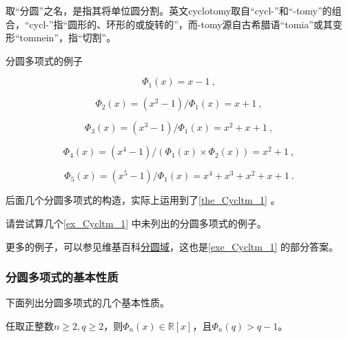 取“分圆”之名，是指其将单位圆分割。英文cyclotomy取自“cycl-”和“-tomy”的组合，“cycl-”指“圆形的、环形的或旋转的”，而-tomy源自古希腊语“tomia”或其变形“tomnein”，指“切割”。




\begin{example}{分圆多项式的例子}\label{ex_Cycltm_1}

\begin{equation}
\Phi_1(x) = x-1~,
\end{equation}

\begin{equation}\label{eq_Cycltm_2}
\Phi_2(x) = (x^2-1)/\Phi_1(x) =  x+1~,
\end{equation}

\begin{equation}
\Phi_3(x) = (x^3-1)/\Phi_1(x) = x^2+x+1~,
\end{equation}

\begin{equation}
\Phi_4(x) = (x^4-1)/\left(\Phi_1(x) \times \Phi_2(x)\right) = x^2+1~,
\end{equation}

\begin{equation}
\Phi_5(x) = (x^5-1)/\Phi_1(x) = x^4+x^3+x^2+x+1~.
\end{equation}

后面几个分圆多项式的构造，实际上运用到了\autoref{the_Cycltm_1} 。

\end{example}

\begin{exercise}{}\label{exe_Cycltm_1}
请尝试算几个\autoref{ex_Cycltm_1} 中未列出的分圆多项式的例子。
\end{exercise}

更多的例子，可以参见维基百科\href{https://en.wikipedia.org/wiki/Cyclotomic_polynomial#Examples}{分圆域}，这也是\autoref{exe_Cycltm_1} 的部分答案。





\subsubsection{分圆多项式的基本性质}


下面列出分圆多项式的几个基本性质。

\begin{theorem}{}
任取正整数$n\geq 2, q\geq 2$，则$\Phi_n(x)\in\mathbb{R}[x]$，且$\Phi_n(q)>q-1$。
\end{theorem}

